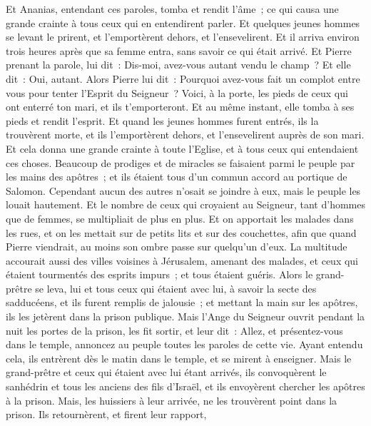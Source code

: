 \begin{multicols}{2}
Et Ananias, entendant ces paroles, tomba et rendit l'âme~; ce qui causa une grande crainte à tous ceux qui en entendirent parler.
Et quelques jeunes hommes se levant le prirent, et l'emportèrent dehors, et l'ensevelirent.
Et il arriva environ trois heures après que sa femme entra, sans savoir ce qui était arrivé.
Et Pierre prenant la parole, lui dit~: Dis-moi, avez-vous autant vendu le champ~? Et elle dit~: Oui, autant.
Alors Pierre lui dit~: Pourquoi avez-vous fait un complot entre vous pour tenter l'Esprit du Seigneur~? Voici, à la porte, les pieds de ceux qui ont enterré ton mari, et ils t'emporteront.
Et au même instant, elle tomba à ses pieds et rendit l'esprit. Et quand les jeunes hommes furent entrés, ils la trouvèrent morte, et ils l'emportèrent dehors, et l'ensevelirent auprès de son mari.
Et cela donna une grande crainte à toute l'Eglise, et à tous ceux qui entendaient ces choses.
Beaucoup de prodiges et de miracles se faisaient parmi le peuple par les mains des apôtres~; et ils étaient tous d'un commun accord au portique de Salomon.
Cependant aucun des autres n'osait se joindre à eux, mais le peuple les louait hautement.
Et le nombre de ceux qui croyaient au Seigneur, tant d'hommes que de femmes, se multipliait de plus en plus.
Et on apportait les malades dans les rues, et on les mettait sur de petits lits et sur des couchettes, afin que quand Pierre viendrait, au moins son ombre passe sur quelqu'un d'eux.
La multitude accourait aussi des villes voisines à Jérusalem, amenant des malades, et ceux qui étaient tourmentés des esprits impurs~; et tous étaient guéris.
Alors le grand-prêtre se leva, lui et tous ceux qui étaient avec lui, à savoir la secte des sadducéens, et ils furent remplis de jalousie~;
et mettant la main sur les apôtres, ils les jetèrent dans la prison publique.
Mais l'Ange du Seigneur ouvrit pendant la nuit les portes de la prison, les fit sortir, et leur dit~:
Allez, et présentez-vous dans le temple, annoncez au peuple toutes les paroles de cette vie.
Ayant entendu cela, ils entrèrent dès le matin dans le temple, et se mirent à enseigner. Mais le grand-prêtre et ceux qui étaient avec lui étant arrivés, ils convoquèrent le sanhédrin et tous les anciens des fils d'Israël, et ils envoyèrent chercher les apôtres à la prison.
Mais, les huissiers à leur arrivée, ne les trouvèrent point dans la prison. Ils retournèrent, et firent leur rapport,

\end{multicols}
